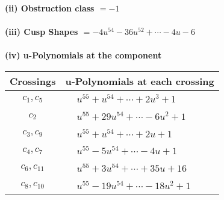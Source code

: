 \documentclass[1p]{elsarticle_modified}
\theoremstyle{definition}
\begin{document}
\flushleft \textbf{(ii) Obstruction class $= -1$}\\~\\
\flushleft \textbf{(iii) Cusp Shapes $= -4 u^{54}-36 u^{52}+\cdots-4 u-6$}\\~\\
\newpage\renewcommand{\arraystretch}{1}
\flushleft \textbf{(iv) u-Polynomials at the component}\newline \\
\begin{tabular}{m{50pt}|m{274pt}}
Crossings & \hspace{64pt}u-Polynomials at each crossing \\
\hline $$\begin{aligned}c_{1},c_{5}\end{aligned}$$&$\begin{aligned}
&u^{55}+u^{54}+\cdots+2 u^3+1
\end{aligned}$\\
\hline $$\begin{aligned}c_{2}\end{aligned}$$&$\begin{aligned}
&u^{55}+29 u^{54}+\cdots-6 u^2+1
\end{aligned}$\\
\hline $$\begin{aligned}c_{3},c_{9}\end{aligned}$$&$\begin{aligned}
&u^{55}+u^{54}+\cdots+2 u+1
\end{aligned}$\\
\hline $$\begin{aligned}c_{4},c_{7}\end{aligned}$$&$\begin{aligned}
&u^{55}-5 u^{54}+\cdots-4 u+1
\end{aligned}$\\
\hline $$\begin{aligned}c_{6},c_{11}\end{aligned}$$&$\begin{aligned}
&u^{55}+3 u^{54}+\cdots+35 u+16
\end{aligned}$\\
\hline $$\begin{aligned}c_{8},c_{10}\end{aligned}$$&$\begin{aligned}
&u^{55}-19 u^{54}+\cdots-18 u^2+1
\end{aligned}$\\
\hline
\end{tabular}\\~\\
\end{document}
